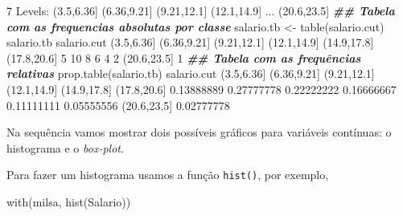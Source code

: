 \documentclass[
  10pt,
  a4paper]{book}
\newenvironment{Shaded}{\begin{snugshade}}{\end{snugshade}}
\newcommand{\DecValTok}[1]{\textcolor[rgb]{0.00,0.00,0.81}{#1}}
\newcommand{\DocumentationTok}[1]{\textcolor[rgb]{0.56,0.35,0.01}{\textbf{\textit{#1}}}}
\newcommand{\FloatTok}[1]{\textcolor[rgb]{0.00,0.00,0.81}{#1}}
\newcommand{\FunctionTok}[1]{\textcolor[rgb]{0.00,0.00,0.00}{#1}}
\newcommand{\NormalTok}[1]{#1}
\newcommand{\OtherTok}[1]{\textcolor[rgb]{0.56,0.35,0.01}{#1}}
\newcommand{\SpecialCharTok}[1]{\textcolor[rgb]{0.00,0.00,0.00}{#1}}
\begin{document}
\begin{Shaded}
\begin{Highlighting}[]
\DecValTok{7}\NormalTok{ Levels}\SpecialCharTok{:}\NormalTok{ (}\FloatTok{3.5}\NormalTok{,}\FloatTok{6.36}\NormalTok{] (}\FloatTok{6.36}\NormalTok{,}\FloatTok{9.21}\NormalTok{] (}\FloatTok{9.21}\NormalTok{,}\FloatTok{12.1}\NormalTok{] (}\FloatTok{12.1}\NormalTok{,}\FloatTok{14.9}\NormalTok{] }\FunctionTok{...}\NormalTok{ (}\FloatTok{20.6}\NormalTok{,}\FloatTok{23.5}\NormalTok{]}
\DocumentationTok{\#\# Tabela com as frequencias absolutas por classe}
\NormalTok{salario.tb }\OtherTok{\textless{}{-}} \FunctionTok{table}\NormalTok{(salario.cut)}
\NormalTok{salario.tb}
\NormalTok{salario.cut}
\NormalTok{ (}\FloatTok{3.5}\NormalTok{,}\FloatTok{6.36}\NormalTok{] (}\FloatTok{6.36}\NormalTok{,}\FloatTok{9.21}\NormalTok{] (}\FloatTok{9.21}\NormalTok{,}\FloatTok{12.1}\NormalTok{] (}\FloatTok{12.1}\NormalTok{,}\FloatTok{14.9}\NormalTok{] (}\FloatTok{14.9}\NormalTok{,}\FloatTok{17.8}\NormalTok{] (}\FloatTok{17.8}\NormalTok{,}\FloatTok{20.6}\NormalTok{] }
          \DecValTok{5}          \DecValTok{10}           \DecValTok{8}           \DecValTok{6}           \DecValTok{4}           \DecValTok{2} 
\NormalTok{(}\FloatTok{20.6}\NormalTok{,}\FloatTok{23.5}\NormalTok{] }
          \DecValTok{1} 
\DocumentationTok{\#\# Tabela com as frequências relativas}
\FunctionTok{prop.table}\NormalTok{(salario.tb)}
\NormalTok{salario.cut}
\NormalTok{ (}\FloatTok{3.5}\NormalTok{,}\FloatTok{6.36}\NormalTok{] (}\FloatTok{6.36}\NormalTok{,}\FloatTok{9.21}\NormalTok{] (}\FloatTok{9.21}\NormalTok{,}\FloatTok{12.1}\NormalTok{] (}\FloatTok{12.1}\NormalTok{,}\FloatTok{14.9}\NormalTok{] (}\FloatTok{14.9}\NormalTok{,}\FloatTok{17.8}\NormalTok{] (}\FloatTok{17.8}\NormalTok{,}\FloatTok{20.6}\NormalTok{] }
 \FloatTok{0.13888889}  \FloatTok{0.27777778}  \FloatTok{0.22222222}  \FloatTok{0.16666667}  \FloatTok{0.11111111}  \FloatTok{0.05555556} 
\NormalTok{(}\FloatTok{20.6}\NormalTok{,}\FloatTok{23.5}\NormalTok{] }
 \FloatTok{0.02777778} 
\end{Highlighting}
\end{Shaded}

Na sequência vamos mostrar dois possíveis gráficos para variáveis
contínuas: o histograma e o \emph{box-plot}.

Para fazer um histograma usamos a função \texttt{hist()}, por exemplo,

\begin{Shaded}
\begin{Highlighting}[]
\FunctionTok{with}\NormalTok{(milsa, }\FunctionTok{hist}\NormalTok{(Salario))}
\end{Highlighting}
\end{Shaded}
\end{document}
